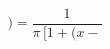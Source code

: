 \documentclass[preview]{standalone}
\begin{document}
\begin{align*}
)=\dfrac{1}{\pi\,[1+(x-}
\end{align*}
\end{document}
